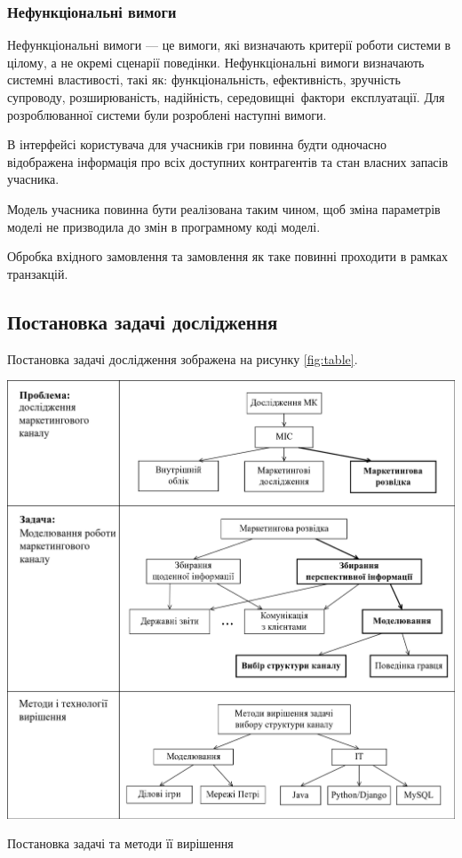         \subsubsection{Нефункціональні вимоги}
Нефункціональні вимоги --- це вимоги, які визначають критерії роботи системи в цілому, а не окремі сценарії поведінки. Нефункціональні вимоги визначають системні властивості, такі як: функціональність, ефективність, зручність супроводу, розширюваність, надійність, середовищні фактори експлуатації. Для розроблюванної системи були розроблені наступні вимоги.
            \begin{longEnumerate}
\item В інтерфейсі користувача для учасників гри повинна будти одночасно відображена інформація про всіх доступних контрагентів та стан власних запасів учасника.
\item Модель учасника повинна бути реалізована таким чином, щоб зміна параметрів моделі не призводила до змін в програмному коді моделі. %
\item Обробка вхідного замовлення та замовлення як таке повинні проходити в рамках транзакцій.
            \end{longEnumerate}  
\subsection{Постановка задачі дослідження}
Постановка задачі дослідження зображена на рисунку \ref{fig:table}.
            \begin{stdfigure}
                \includegraphics[width=7in]{images/table.png}
                \caption{Постановка задачі та методи її вирішення}
                \label{fig:table}
            \end{stdfigure}

